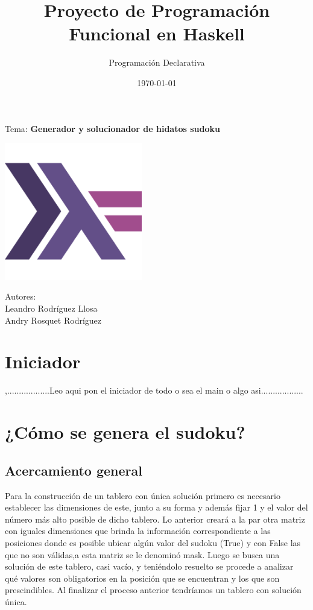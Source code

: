 \documentclass[10pt]{amsart}
\title{Proyecto de Programaci\'on Funcional en Haskell}
\author{Programaci\'on Declarativa}
\date{\today}
\begin{document}
	\begin{titlepage}
		\clearpage
		\maketitle
		
		\vspace{3em}
		\begin{center}
			Tema: \textbf{Generador y solucionador de hidatos sudoku} 	

            \vspace{6em}
			\begin{center}
        		\includegraphics[width=6cm]{haskell.png}
        	\end{center}

			\vspace{6em}
			Autores: \\
			Leandro Rodríguez Llosa \\
			Andry Rosquet Rodríguez
		\end{center}
		\thispagestyle{empty}
	\end{titlepage}

    \normalsize
 
	\small
	\section*{Iniciador}
	,..................Leo aqui pon el iniciador de todo o sea el main o algo asi.................. 
	\section*{ ¿C\'omo se genera el sudoku?}
	\subsection*{Acercamiento general}
	Para la construcci\'on de un tablero con \'unica soluci\'on primero es necesario establecer las dimensiones de este, junto a su forma y adem\'as fijar 1 y el valor del n\'umero m\'as alto posible de dicho tablero. Lo anterior crear\'a a la par otra matriz con iguales dimensiones que brinda la informaci\'on correspondiente a las posiciones donde es posible ubicar alg\'un valor del sudoku (True) y con False las que no son v\'alidas,a esta matriz se le denomin\'o mask. Luego se busca una soluci\'on de este tablero, casi vac\'io, y teni\'endolo resuelto se procede a analizar qué valores son obligatorios en la posici\'on que se encuentran y los que son prescindibles. Al finalizar el proceso anterior tendr\'iamos un tablero con soluci\'on \'unica.
\end{document}
